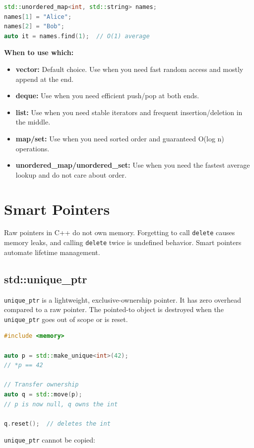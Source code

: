 \begin{lstlisting}[language=C++]
std::unordered_map<int, std::string> names;
names[1] = "Alice";
names[2] = "Bob";
auto it = names.find(1);  // O(1) average
\end{lstlisting}

\textbf{When to use which:}
\begin{itemize}
\item \textbf{vector:} Default choice. Use when you need fast random access and mostly append at the end.
\item \textbf{deque:} Use when you need efficient push/pop at both ends.
\item \textbf{list:} Use when you need stable iterators and frequent insertion/deletion in the middle.
\item \textbf{map/set:} Use when you need sorted order and guaranteed O(log n) operations.
\item \textbf{unordered\_map/unordered\_set:} Use when you need the fastest average lookup and do not care about order.
\end{itemize}

\section{Smart Pointers}

Raw pointers in C++ do not own memory. Forgetting to call \texttt{delete} causes memory leaks, and calling \texttt{delete} twice is undefined behavior. Smart pointers automate lifetime management.

\subsection{std::unique\_ptr}

\texttt{unique\_ptr} is a lightweight, exclusive-ownership pointer. It has zero overhead compared to a raw pointer. The pointed-to object is destroyed when the \texttt{unique\_ptr} goes out of scope or is reset.

\begin{lstlisting}[language=C++]
#include <memory>

auto p = std::make_unique<int>(42);
// *p == 42

// Transfer ownership
auto q = std::move(p);
// p is now null, q owns the int

q.reset();  // deletes the int
\end{lstlisting}

\texttt{unique\_ptr} cannot be copied:

